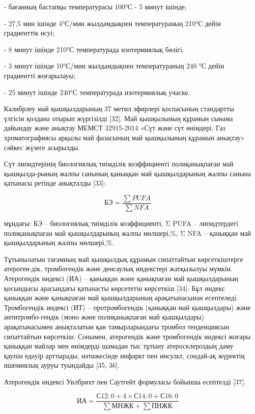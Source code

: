 \begin{multicols}{2}
- бағанның бастапқы температурасы 100°С - 5 минут ішінде;

- 27,5 мин ішінде 4°С/мин жылдамдықпен температураның 210°С дейін
градиенттік өсуі;

- 8 минут ішінде 210°С температурада изотермиялық бөлігі.

- 3 минут ішінде 10°С/мин жылдамдықпен температураның 240 °С дейін
градиентті жоғарылауы;

- 25 минут ішінде 240°С температурада изотермиялық учаске.

Калибрлеу май қышқылдарының 37 метил эфирлері қоспасының стандартты
үлгісін қолдана отырып жүргізілді {[}32{]}. Май қышқылының құрамын
сынама дайындау және анықтау МЕМСТ 32915-2014 «Сүт және сүт өнімдері.
Газ хроматографиясы арқылы май фазасының май қышқылының құрамын анықтау»
сәйкес жүзеге асырылды.

Сүт липидтерінің биологиялық тиімділік коэффициенті полиқанықпаған май
қышқылда-рының жалпы санының қаныққан май қышқылдарының жалпы санына
қатынасы ретінде анықталды {[}33{]}:

\begin{equation}
  \text{БЭ} = \frac{\sum PUFA}{\sum NFA}
  \end{equation}
  

мұндағы: БЭ -- биологиялық тиімділік коэффициенті, Σ PUFA --
липидтердегі полиқанықпаған май қышқылдарының жалпы мөлшері,\%, Σ NFA --
қаныққан май қышқылдарының жалпы мөлшері,\%.

Тұтынылатын тағамның май қышқылдық құрамын сипаттайтын көрсеткіштерге
атероген-дік, тромбогендік және денсаулық индекстері жатқызылуы мүмкін.
Атерогендік индексі (ИА) -- қаныққан және қанықпаған май қышқылдарының
қосындысы арасындағы қатынасты көрсететін көрсеткіш {[}34{]}. Бұл индекс
қаныққан және қанықпаған май қышқылдарының арақатынасынан есептеледі.
Тромбогендік индексі (ИТ) -- протромбогендік (қаныққан май қышқылдары)
және антитромбо-гендік (моно және полиқанықпаған май қышқылдары)
арақатынасымен анықталатын қан тамырларындағы тромбоз тенденциясын
сипаттайтын көрсеткіш. Сонымен, атерогендік және тромбогендік индексі
жоғары қаныққан майлар мен өнімдерді шамадан тыс тұтыну атеросклероздың
даму қаупін едәуір арттырады, нәтижесінде инфаркт пен инсульт, сондай-ақ
жүректің ишемиялық ауруы туындайды {[}35, 36{]}.
\end{multicols}
Атерогендік индексі Уилбрихт пен Саутгейт формуласы бойынша есептелді
{[}37{]}.


\begin{equation}
\text{ИА} = \frac{С12:0 + 4 \times С14:0 + С16:0}{\sum \text{МНЖК} + \sum \text{ПНЖК}}
\end{equation}

